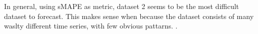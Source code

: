 
In general, using sMAPE as metric, dataset 2 seems to be the most difficult dataset to forecast.
This makes sense when because the dataset consists of many waslty different time series,
with few obvious pattarns.
.